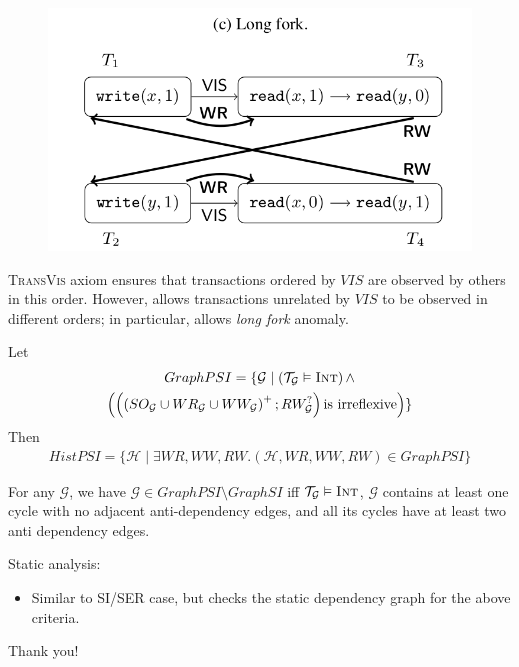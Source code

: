 \documentclass{beamer}
\begin{document}
\begin{frame}
	\begin{figure}
		\includegraphics[scale=0.25]{fig2c}
	\end{figure}
	\begin{definition}
		\textsc{TransVis} axiom ensures that transactions ordered by $VIS$ are observed by others in this order. However, allows transactions unrelated by $VIS$ to be observed in different orders; in particular, allows \textit{long fork} anomaly. \\
	\end{definition}
\end{frame}

\begin{frame}
	\begin{theorem}
	Let
		\begin{multline*}
		GraphPSI = \{ \mathcal{G} \mid \left( \mathcal{T}_\mathcal{G} \vDash \textsc{Int} \right) \wedge \\
			\left(
				\left(
					\left(
					SO_\mathcal{G} \cup WR_\mathcal{G} \cup WW_\mathcal{G}
					\right)^+; RW_\mathcal{G}^?
				\right) \text{is irreflexive}
			\right)
		\}
		\end{multline*}
		Then
		\begin{multline*}
		HistPSI = \{ \mathcal{H} \mid  \exists WR,WW,RW.
		 (\mathcal{H}, WR, WW, RW) \in GraphPSI \}
		\end{multline*}
	\end{theorem}
\end{frame}

\begin{frame}
	\begin{theorem}
		For any $\mathcal{G}$, we have $\mathcal{G} \in GraphPSI \setminus GraphSI $ iff $\mathcal{T}_\mathcal{G} \vDash \textsc{Int}$, $\mathcal{G}$ contains at least one cycle with no adjacent anti-dependency edges, and all its cycles have at least two anti dependency edges.
	\end{theorem}
	
	Static analysis:
	\begin{itemize}
		\item Similar to SI/SER case, but checks the static dependency graph for the above criteria.
	\end{itemize}
\end{frame}


\begin{frame}
	\begin{center}
		Thank you!
	\end{center}
\end{frame}
\end{document}
